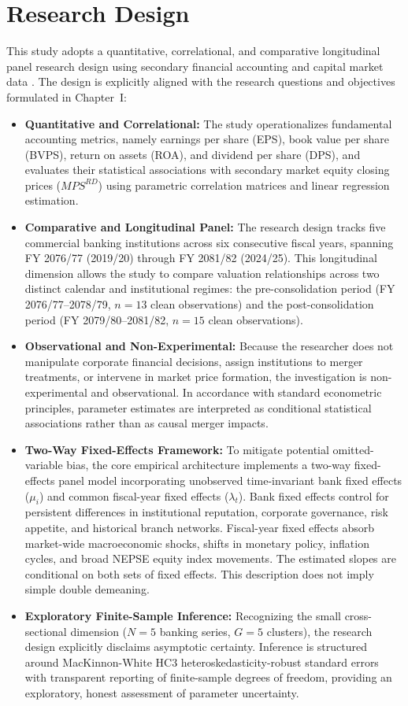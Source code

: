 \section{Research Design}
This study adopts a quantitative, correlational, and comparative longitudinal panel research design using secondary financial accounting and capital market data \citep{pant2016}. The design is explicitly aligned with the research questions and objectives formulated in Chapter~I:
\begin{itemize}
    \item \textbf{Quantitative and Correlational:} The study operationalizes fundamental accounting metrics, namely earnings per share (EPS), book value per share (BVPS), return on assets (ROA), and dividend per share (DPS), and evaluates their statistical associations with secondary market equity closing prices ($\mathit{MPS}^{RD}$) using parametric correlation matrices and linear regression estimation.
    \item \textbf{Comparative and Longitudinal Panel:} The research design tracks five commercial banking institutions across six consecutive fiscal years, spanning FY 2076/77 (2019/20) through FY 2081/82 (2024/25). This longitudinal dimension allows the study to compare valuation relationships across two distinct calendar and institutional regimes: the pre-consolidation period (FY 2076/77--2078/79, $n = 13$ clean observations) and the post-consolidation period (FY 2079/80--2081/82, $n = 15$ clean observations).
    \item \textbf{Observational and Non-Experimental:} Because the researcher does not manipulate corporate financial decisions, assign institutions to merger treatments, or intervene in market price formation, the investigation is non-experimental and observational. In accordance with standard econometric principles, parameter estimates are interpreted as conditional statistical associations rather than as causal merger impacts.
    \item \textbf{Two-Way Fixed-Effects Framework:} To mitigate potential omitted-variable bias, the core empirical architecture implements a two-way fixed-effects panel model incorporating unobserved time-invariant bank fixed effects ($\mu_i$) and common fiscal-year fixed effects ($\lambda_t$). Bank fixed effects control for persistent differences in institutional reputation, corporate governance, risk appetite, and historical branch networks. Fiscal-year fixed effects absorb market-wide macroeconomic shocks, shifts in monetary policy, inflation cycles, and broad NEPSE equity index movements. The estimated slopes are conditional on both sets of fixed effects. This description does not imply simple double demeaning.
    \item \textbf{Exploratory Finite-Sample Inference:} Recognizing the small cross-sectional dimension ($N = 5$ banking series, $G = 5$ clusters), the research design explicitly disclaims asymptotic certainty. Inference is structured around MacKinnon-White HC3 heteroskedasticity-robust standard errors with transparent reporting of finite-sample degrees of freedom, providing an exploratory, honest assessment of parameter uncertainty.
\end{itemize}


